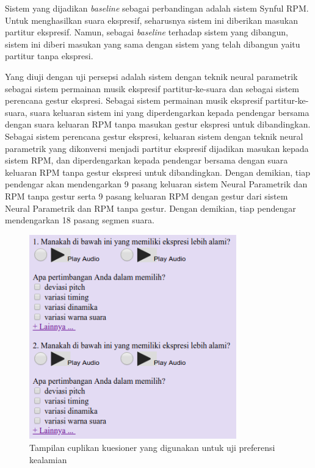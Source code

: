 Sistem yang dijadikan \textit{baseline} sebagai perbandingan adalah sistem Synful RPM. Untuk menghasilkan suara ekspresif, seharusnya sistem ini diberikan masukan partitur ekspresif. Namun, sebagai \textit{baseline} terhadap sistem yang dibangun, sistem ini diberi masukan yang sama dengan sistem yang telah dibangun yaitu partitur tanpa ekspresi.

Yang diuji dengan uji persepsi adalah sistem dengan teknik neural parametrik sebagai sistem permainan musik ekspresif partitur-ke-suara dan sebagai sistem perencana gestur ekspresi. Sebagai sistem permainan musik ekspresif partitur-ke-suara, suara keluaran sistem ini yang diperdengarkan kepada pendengar bersama dengan suara keluaran RPM tanpa masukan gestur ekspresi untuk dibandingkan. Sebagai sistem perencana gestur ekspresi, keluaran sistem dengan teknik neural parametrik yang dikonversi menjadi partitur ekspresif dijadikan masukan kepada sistem RPM, dan diperdengarkan kepada pendengar bersama dengan suara keluaran RPM tanpa gestur ekspresi untuk dibandingkan. Dengan demikian, tiap pendengar akan mendengarkan 9 pasang keluaran sistem Neural Parametrik dan RPM tanpa gestur serta 9 pasang keluaran RPM dengan gestur dari sistem Neural Parametrik dan RPM tanpa gestur. Dengan demikian, tiap pendengar mendengarkan 18 pasang segmen suara.

\begin{figure}
\centering
    \includegraphics[width=0.8\textwidth]{resources/questionnaire_screenshot.png}
    \caption{Tampilan cuplikan kuesioner yang digunakan untuk uji preferensi kealamian}\label{fig-questionnaire-sample}
\end{figure}

